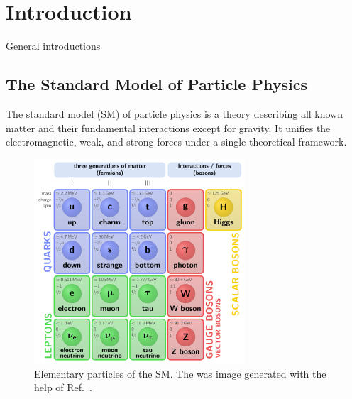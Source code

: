 
\chapter{Introduction}\label{chap:one}

General introductions

\section{The Standard Model of Particle Physics}
The standard model (\acs{SM}) of particle physics is a theory describing all known matter and their fundamental interactions except for gravity. It unifies the electromagnetic, weak, and strong forces under a single theoretical framework.
\begin{figure}
\centering
\includegraphics[width=0.7\textwidth]{Images/SM.pdf}
\caption{Elementary particles of the \acs{SM}. The was image generated with the help of Ref.~\cite{Neutelings_2024}.}
\label{fig:1:SM}
\end{figure}
